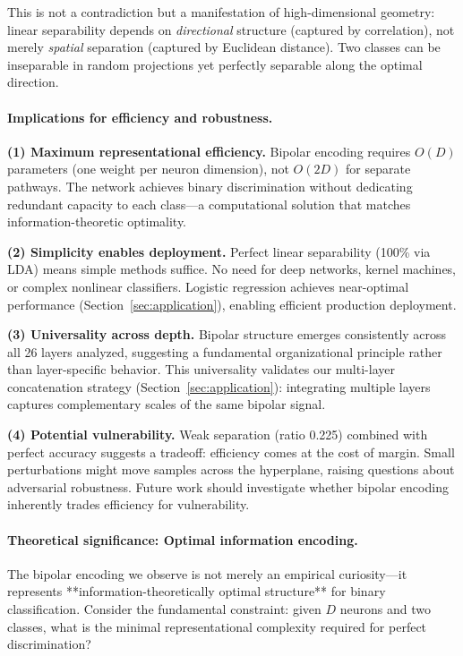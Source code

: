 \documentclass[11pt]{article}
\begin{document}
This is not a contradiction but a manifestation of high-dimensional geometry: linear separability depends on \textit{directional} structure (captured by correlation), not merely \textit{spatial} separation (captured by Euclidean distance). Two classes can be inseparable in random projections yet perfectly separable along the optimal direction.

\paragraph{Implications for efficiency and robustness.}

\textbf{(1) Maximum representational efficiency.} Bipolar encoding requires $O(D)$ parameters (one weight per neuron dimension), not $O(2D)$ for separate pathways. The network achieves binary discrimination without dedicating redundant capacity to each class---a computational solution that matches information-theoretic optimality.

\textbf{(2) Simplicity enables deployment.} Perfect linear separability (100\% via LDA) means simple methods suffice. No need for deep networks, kernel machines, or complex nonlinear classifiers. Logistic regression achieves near-optimal performance (Section~\ref{sec:application}), enabling efficient production deployment.

\textbf{(3) Universality across depth.} Bipolar structure emerges consistently across all 26 layers analyzed, suggesting a fundamental organizational principle rather than layer-specific behavior. This universality validates our multi-layer concatenation strategy (Section~\ref{sec:application}): integrating multiple layers captures complementary scales of the same bipolar signal.

\textbf{(4) Potential vulnerability.} Weak separation (ratio 0.225) combined with perfect accuracy suggests a tradeoff: efficiency comes at the cost of margin. Small perturbations might move samples across the hyperplane, raising questions about adversarial robustness. Future work should investigate whether bipolar encoding inherently trades efficiency for vulnerability.


\paragraph{Theoretical significance: Optimal information encoding.}
The bipolar encoding we observe is not merely an empirical curiosity—it represents **information-theoretically optimal structure** for binary classification. Consider the fundamental constraint: given $D$ neurons and two classes, what is the minimal representational complexity required for perfect discrimination?
\end{document}
